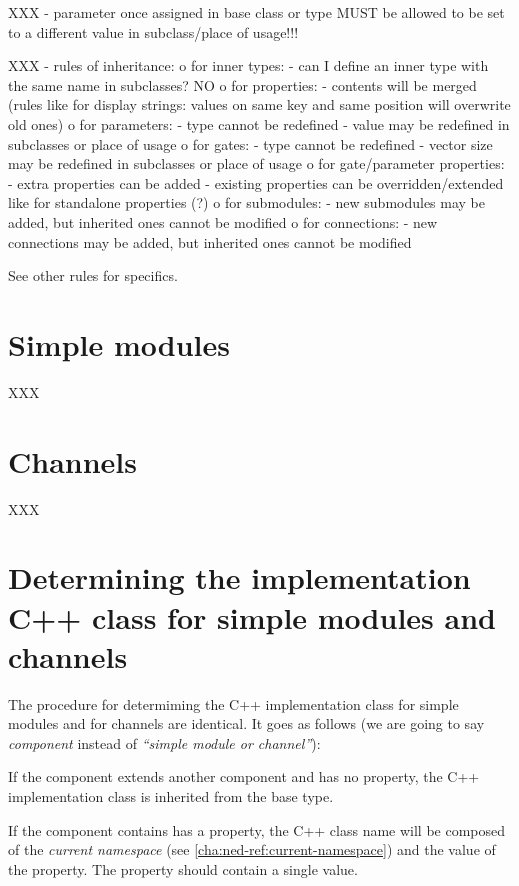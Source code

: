 XXX
- parameter once assigned in base class or type MUST be allowed to be
  set to a different value in subclass/place of usage!!!

XXX
- rules of inheritance:
    o for inner types:
       - can I define an inner type with the same name in subclasses? NO
    o for properties:
       - contents will be merged (rules like for display strings: values on
         same key and same position will overwrite old ones)
    o for parameters:
       - type cannot be redefined
       - value may be redefined in subclasses or place of usage
    o for gates:
       - type cannot be redefined
       - vector size may be redefined in subclasses or place of usage
    o for gate/parameter properties:
       - extra properties can be added
       - existing properties can be overridden/extended like for standalone properties (?)
    o for submodules:
       - new submodules may be added, but inherited ones cannot be modified
    o for connections:
       - new connections may be added, but inherited ones cannot be modified

See other rules for specifics.

\section{Simple modules}

XXX

\section{Channels}

XXX

\section[C++ class for simple modules/channels]{Determining the implementation
C++ class for simple modules and channels}

The procedure for determiming the C++ implementation class for simple modules
and for channels are identical. It goes as follows (we are going to say
\textit{component} instead of \textit{``simple module or channel''}):

If the component extends another component and has no
 property, the C++ implementation class is inherited from the base
type.

If the component contains has a  property, the C++ class
name will be composed of the \textit{current namespace} (see
\ref{cha:ned-ref:current-namespace}) and the value of the 
property. The  property should contain a single value.


